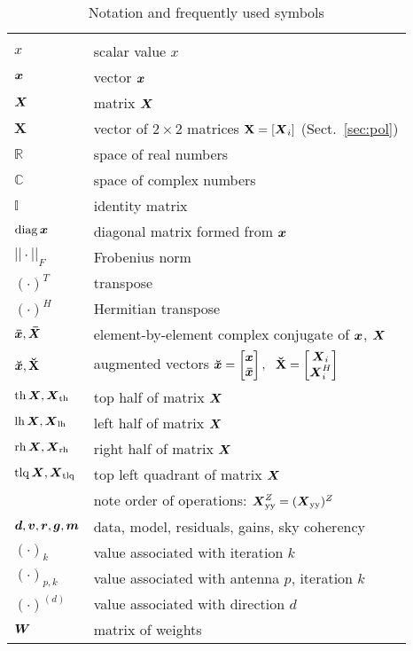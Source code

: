 \documentclass[useAMS,usenatbib]{mn2e}
\newcommand{\COMPLEX}{\mathbb{C}}
\newcommand{\REAL}{\mathbb{R}}
\newcommand{\II}{\mathbb{I}}
\begin{document}
\begin{table}
\caption{\label{tab:notation}Notation and frequently used symbols}
\begin{tabular}{ll}
\hline\\
$x$        & scalar value $x$    \\
$\bmath{x}$  & vector $\bmath{x}$  \\
$\bmath{X}$  & matrix $\bmath{X}$ \\
$\mathbf{X}$  & vector of $2\times2$ matrices $\mathbf{X}=[\bmath{X}_i]$ (Sect.~\ref{sec:pol})  \\
$\REAL$ & space of real numbers \\
$\COMPLEX$ & space of complex numbers \\
$\II$ & identity matrix \\
$\mathrm{diag}\,\bmath{x}$ & diagonal matrix formed from $\bmath{x}$\\
$||\cdot||_F$ & Frobenius norm \\
$(\cdot)^T$ & transpose \\
$(\cdot)^H$ & Hermitian transpose \\
$\bmath{\bar x},\bmath{\bar X}$ & element-by-element complex conjugate of $\bmath{x}$, $\bmath{X}$  \\
$\AUG{x}, \AUGx{X}$ & augmented vectors $\AUG{x} = \Matrix{c}{\bmath{x} \\ \bmath{\bar x}},~~\AUGx{X}=\Matrix{c}{\bmath{X}_i \\ \bmath{X}^H_i}$ \\
$\TOP\,\bmath{X}, \bmath{X}_\TOP$ & top half of matrix $\bmath{X}$\\
$\LEFT\,\bmath{X}, \bmath{X}_\LEFT$ & left half of matrix $\bmath{X}$ \\
$\RIGHT\,\bmath{X}, \bmath{X}_\RIGHT$ & right half of matrix $\bmath{X}$\\
$\UL\,\bmath{X}, \bmath{X}_\UL$ & top left quadrant of matrix $\bmath{X}$\\
& note order of operations: $\bmath{X}_\mathrm{yy}^Z = (\bmath{X}_\mathrm{yy})^Z$\\
$\bmath{d},\bmath{v},\bmath{r}, \bmath{g}, \bmath{m} $ & data, model, residuals, gains, sky coherency\\
$(\cdot)_k$ & value associated with iteration $k$ \\
$(\cdot)_{p,k}$ & value associated with antenna $p$, iteration $k$ \\
$(\cdot)^{(d)}$ & value associated with direction $d$\\
$\bmath{W}$ & matrix of weights \\

\end{tabular}
\end{table}
\end{document}
